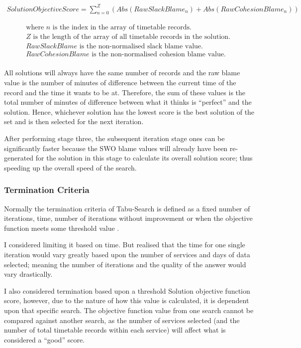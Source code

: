 \documentclass{article}
\begin{document}
\begin{gather}
	Solution Objective Score  = \sum^{Z}_{n=0} (Abs(Raw Slack Blame_n) + Abs(Raw Cohesion Blame_n))
\end{gather}


\begin{align*}
	\text{where~$n$ is the index in the array of timetable records.} \\
	\text{$Z$ is the length of the array of all timetable records in the solution. } \\
	\text{$Raw Slack Blame$ is the non-normalised slack blame value.} \\
	\text{$Raw Cohesion Blame$ is the non-normalised cohesion blame value.} \\
\end{align*}

All solutions will always have the same number of records and the raw blame value is the number of minutes of difference between the current time of the record and the time it wants to be at. Therefore, the sum of these values is the total number of minutes of difference between what it thinks is ``perfect'' and the solution. Hence, whichever solution has the lowest score is the best solution of the set and is then selected for the next iteration.

\par 
After performing stage three, the subsequent iteration stage ones can be significantly faster because the SWO blame values will already have been re-generated for the solution in this stage to calculate its overall solution score; thus speeding up the overall speed of the search.



\subsubsection{Termination Criteria}

Normally the termination criteria of Tabu-Search is defined as a fixed number of iterations, time, number of iterations without improvement or when the objective function meets some threshold value \cite{RN35}.

\par 
I considered limiting it based on time. But realised that the time for one single iteration would vary greatly based upon the number of services and days of data selected; meaning the number of iterations and the quality of the answer would vary drastically.

\par 
I also considered termination based upon a threshold Solution objective function score, however, due to the nature of how this value is calculated, it is dependent upon that specific search. The objective function value from one search cannot be compared against another search, as the number of services selected (and the number of total timetable records within each service) will affect what is considered a ``good'' score. 
\end{document}
